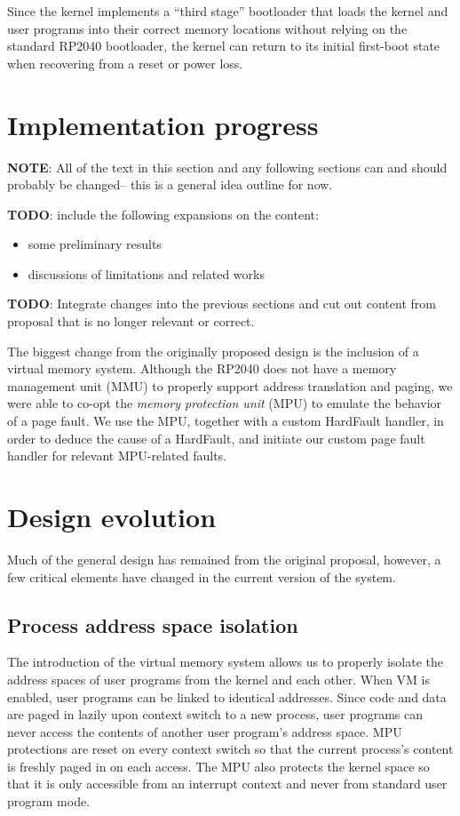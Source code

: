 \documentclass[12pt]{article}
\begin{document}
Since the kernel implements a ``third stage'' bootloader that loads the kernel
and user programs into their correct memory locations without relying on the
standard RP2040 bootloader, the kernel can return to its initial first-boot
state when recovering from a reset or power loss.

\section{Implementation progress}
\textbf{NOTE}: All of the text in this section and any following sections can
and should probably be changed-- this is a general idea outline for now.

\textbf{TODO}: include the following expansions on the content:

\begin{itemize}
    \item some preliminary results 
    \item discussions of limitations and related works
\end{itemize}

\textbf{TODO}: Integrate changes into the previous sections and cut out content
from proposal that is no longer relevant or correct.
\vspace{1em}

The biggest change from the originally proposed design is the inclusion of a
virtual memory system. Although the RP2040 does not have a memory management
unit (MMU) to properly support address translation and paging, we were able
to co-opt the \emph{memory protection unit} (MPU) to emulate the behavior of a
page fault. We use the MPU, together with a custom HardFault handler, in order
to deduce the cause of a HardFault, and initiate our custom page fault handler
for relevant MPU-related faults.


\section{Design evolution}
Much of the general design has remained from the original proposal, however, a
few critical elements have changed in the current version of the system.

\subsection{Process address space isolation}
The introduction of the virtual memory system allows us to properly isolate
the address spaces of user programs from the kernel and each other. When VM is
enabled, user programs can be linked to identical addresses. Since code and data
are paged in lazily upon context switch to a new process, user programs can
never access the contents of another user program's address space. MPU
protections are reset on every context switch so that the current process's
content is freshly paged in on each access. The MPU also protects the kernel
space so that it is only accessible from an interrupt context and never from
standard user program mode.
\end{document}
